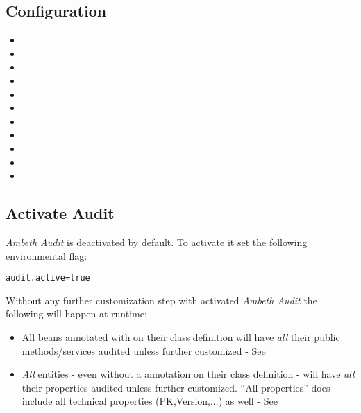 \subsection{Configuration}
\begin{itemize}
	\item {}
	\item {}
	\item {}
	\item {}
	\item {}
	\item {}
	\item {}
	\item {}
	\item {}
	\item {}
	\item {}
\end{itemize}

\subsection{Activate Audit}
\textit{Ambeth Audit} is deactivated by default. To activate it set the following environmental flag:
\begin{lstlisting}[style=Props]
audit.active=true
\end{lstlisting}

Without any further customization step with activated \textit{Ambeth Audit} the following will happen at runtime:
\begin{itemize}
	\item All beans annotated with \type{\@Audited} on their class definition will have \emph{all} their public methods/services audited unless further customized - See 
	\item \emph{All} entities - even without a  annotation on their class definition - will have \emph{all} their properties audited unless further customized. ``All properties'' does include all technical properties (PK,Version,...) as well - See 
\end{itemize}

